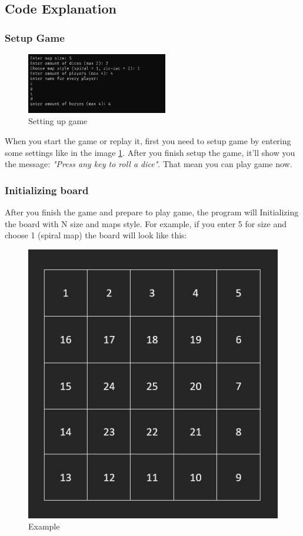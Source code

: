 \documentclass{article}
\begin{document}
\subsection{Code Explanation}
\subsubsection{Setup Game}
\begin{figure}
	\includegraphics[width=0.55\textwidth]{setup}
	\caption{Setting up game}
	\label{fig:setup}
\end{figure}
When you start the game or replay it, first you need to setup game by entering some settings like in the image \ref{fig:setup}. After you finish setup the game, it'll show you the message: \textit{"Press any key to roll a dice"}. That mean you can play game now.

\subsubsection{Initializing board}
After you finish the game and prepare to play game, the program will Initializing the board with N size and maps style. For example, if you enter 5 for size and choose 1 (spiral map) the board will look like this:
\begin{figure}
	\includegraphics[width=1\textwidth]{example}
	\caption{Example}
	\label{fig:example}
\end{figure}
\end{document}
